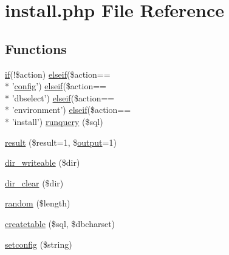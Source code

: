 \hypertarget{install_8php}{\section{install.\+php File Reference}
\label{install_8php}
}
\subsection*{Functions}
\begin{DoxyCompactItemize}
\item 
\hyperlink{login__old_8php_a4ac1118c2e44c513a674bc1793ba6c90}{if}(!\$action) \hyperlink{urlist_8php_a77f52b43f81ed05a41b68c2161789055}{elseif}(\$action== \\*
'\hyperlink{global_8func_8php_a239de3ed26da8daceb8acacdcb03325d}{config}') \hyperlink{urlist_8php_a77f52b43f81ed05a41b68c2161789055}{elseif}(\$action== \\*
'dbselect') \hyperlink{urlist_8php_a77f52b43f81ed05a41b68c2161789055}{elseif}(\$action== \\*
'environment') \hyperlink{urlist_8php_a77f52b43f81ed05a41b68c2161789055}{elseif}(\$action== \\*
'install') \hyperlink{install_8php_aad7d53b35a4a2d6e7993c1e1ba7c27ee}{runquery} (\$sql)
\item 
\hyperlink{install_8php_abdecde238169a1e34f68354fc9968af0}{result} (\$result=1, \$\hyperlink{global_8func_8php_aacaca1dd81eba78d1d4363ca06608961}{output}=1)
\item 
\hyperlink{install_8php_a0963b1f5ef087570e5993ee12ae535e0}{dir\+\_\+writeable} (\$dir)
\item 
\hyperlink{install_8php_afe48521b311213a1f840bbecaa10324f}{dir\+\_\+clear} (\$dir)
\item 
\hyperlink{install_8php_acf9d180aa0d66fc296feea1f05a9ac78}{random} (\$length)
\item 
\hyperlink{install_8php_a37da93c3858053699c00fff132ed7e28}{createtable} (\$sql, \$dbcharset)
\item 
\hyperlink{install_8php_a46305e0d4c82055b75d574bb6f45e059}{setconfig} (\$string)
\end{DoxyCompactItemize}
